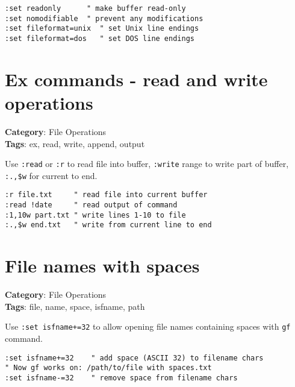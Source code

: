 {{{{{\begin{Exa*}{}
\begin{Verbatim}[fontsize=\footnotesize, breaklines, breakanywhere]
:set readonly      " make buffer read-only
:set nomodifiable  " prevent any modifications
:set fileformat=unix  " set Unix line endings
:set fileformat=dos   " set DOS line endings
\end{Verbatim}
\end{Exa*}

\section{Ex commands - read and write operations}

\textbf{Category}: File Operations\\ \textbf{Tags}: ex, read, write, append, output
\vspace{0.5cm}

Use {\footnotesize \Verb§:read§} or {\footnotesize \Verb§:r§} to read file into buffer, {\footnotesize \Verb§:write§} range to write part of buffer, {\footnotesize \Verb§:.,$w§} for current to end.

\begin{Exa*}{}
\begin{Verbatim}[fontsize=\footnotesize, breaklines, breakanywhere]
:r file.txt     " read file into current buffer
:read !date     " read output of command
:1,10w part.txt " write lines 1-10 to file
:.,$w end.txt   " write from current line to end
\end{Verbatim}
\end{Exa*}

\section{File names with spaces}

\textbf{Category}: File Operations\\ \textbf{Tags}: file, name, space, isfname, path
\vspace{0.5cm}

Use {\footnotesize \Verb§:set isfname+=32§} to allow opening file names containing spaces with {\footnotesize \Verb§gf§} command.

\begin{Exa*}{}
\begin{Verbatim}[fontsize=\footnotesize, breaklines, breakanywhere]
:set isfname+=32    " add space (ASCII 32) to filename chars
" Now gf works on: /path/to/file with spaces.txt
:set isfname-=32    " remove space from filename chars
\end{Verbatim}
\end{Exa*}

}}}}}
